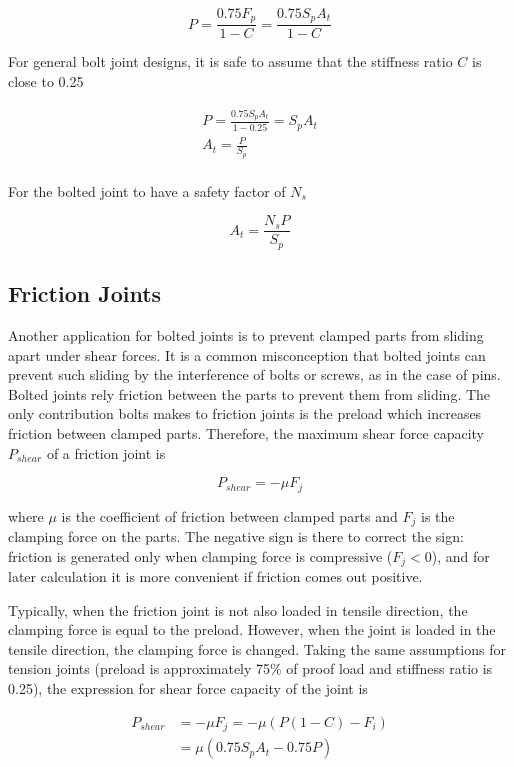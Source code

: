\documentclass[a4paper,openany,12pt]{book}
\begin{document}
{{$$P = \frac{0.75F_p}{1 - C} = \frac{0.75S_pA_t}{1 - C}$$

For general bolt joint designs, it is safe to assume that the stiffness
ratio \(C\) is close to 0.25

$$\begin{gathered}
  P = \frac{0.75S_pA_t}{1 - 0.25} = S_pA_t \\ 
  A_t = \frac{P}{S_p} \\ 
\end{gathered}$$

For the bolted joint to have a safety factor of \(N_s\)

$$\label{eqn: tension joint bolt sizing}
  A_t = \frac{N_sP}{S_p}$$

\subsection{Friction Joints}
\label{friction-joints}
Another application for bolted joints is to prevent clamped parts from
sliding apart under shear forces. It is a common misconception that
bolted joints can prevent such sliding by the interference of bolts or
screws, as in the case of pins. Bolted joints rely friction between the
parts to prevent them from sliding. The only contribution bolts makes to
friction joints is the preload which increases friction between clamped
parts. Therefore, the maximum shear force capacity \(P_{shear}\) of a
friction joint is


$$P_{shear} = -\mu F_j$$

where \(\mu\) is the coefficient of friction between clamped parts and
\(F_j\) is the clamping force on the parts. The negative sign is there to
correct the sign: friction is generated only when clamping force is
compressive (\(F_j < 0\)), and for later calculation it is more convenient
if friction comes out positive.

Typically, when the friction joint is not also loaded in tensile
direction, the clamping force is equal to the preload. However, when the
joint is loaded in the tensile direction, the clamping force is changed.
Taking the same assumptions for tension joints (preload is approximately
75\% of proof load and stiffness ratio is 0.25), the expression for shear
force capacity of the joint is

$$\begin{aligned}
  P_{shear} &= -\mu F_j = -\mu \left( P(1 - C) - F_i \right) \\
            &= \mu (0.75S_pA_t - 0.75P)\end{aligned}$$

}}
\end{document}
